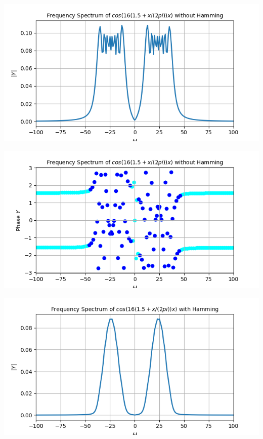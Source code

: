 \documentclass[12pt, a4paper]{report}
\begin{document}
\begin{center}
	\includegraphics[scale=0.8]{Figure_22.png} 
	\label{fig:rawdata}
\end{center}
\begin{center}
	\includegraphics[scale=0.8]{Figure_23.png} 
	\label{fig:rawdata}
\end{center}
\begin{center}
	\includegraphics[scale=0.8]{Figure_24.png} 
	\label{fig:rawdata}
\end{center}
\clearpage
\end{document}
